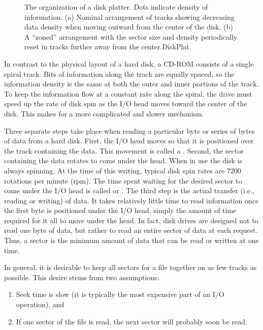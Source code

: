 \begin{figure}
\vspace{-\smallskipamount}

\vspace{-\medskipamount}

{The organization of a disk platter.
Dots indicate density of information.
(a) Nominal arrangement of tracks showing decreasing data density when
moving outward from the center of the disk.
(b) A ``zoned'' arrangement with the sector size and density
periodically reset in tracks further away from the center.}{DiskPlat}
\bigskip
\end{figure}

In contrast to the physical layout of a hard disk, a CD-ROM consists
of a single spiral track.
Bits of information along the track are equally spaced, so the
information density is the same at both the outer and inner portions
of the track.
To keep the information flow at a constant rate along the spiral, the
drive must speed up the rate of disk spin as the I/O head moves
toward the center of the disk.
This makes for a more complicated and slower mechanism.

Three separate steps take place when reading a particular byte or
series of bytes of data from a hard disk.
First, the I/O head moves so that it is positioned over the track
containing the data.
This movement is called a .
Second, the sector containing the data rotates to come under the
head.
When in use the disk is always spinning.
At the time of this writing, typical disk spin rates are
7200 rotations per minute (rpm).
The time spent waiting for the desired sector to come under
the I/O head is called  or
.
The third step is the actual transfer (i.e., reading or writing) of
data.
It takes relatively little time to read information once the first
byte is positioned under the I/O head, simply the amount of time
required for it all to move under the head.
In fact, disk drives are designed not to read one byte of data, but
rather to read an entire sector of data at each request.
Thus, a sector is the minimum amount of data that can be read or
written at one time.

In general, it is desirable to keep all sectors for a file together on 
as few tracks as possible.
This desire stems from two assumptions:

\begin{enumerate}

\item
Seek time is slow (it is typically the most expensive part of
an I/O operation), and

\item
If one sector of the file is read, the next sector will
probably soon be read.

\end{enumerate}

